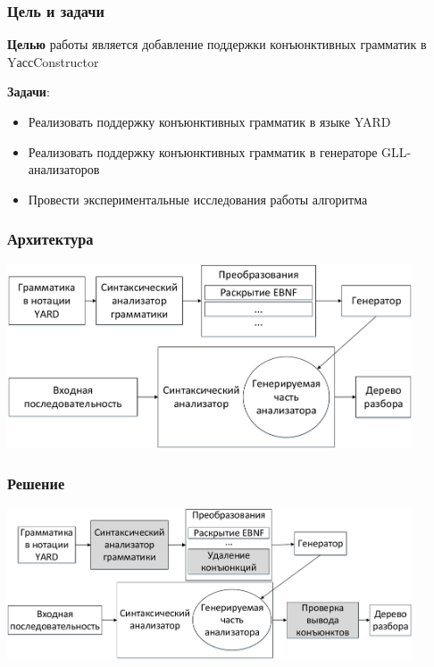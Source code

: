 \documentclass{beamer}
\begin{document}
\begin{frame}
  \transwipe[direction=90]
  \frametitle{Цель и задачи}
  \textbf{Целью} работы является добавление поддержки конъюнктивных грамматик в YассConstructor  

  \textbf{Задачи}:
  \begin{itemize}
    \item Реализовать поддержку конъюнктивных грамматик в языке YARD
    \item Реализовать поддержку конъюнктивных грамматик в генераторе GLL-анализаторов
    \item Провести экспериментальные исследования работы алгоритма
  \end{itemize}
\end{frame}

\begin{frame}
  \transwipe[direction=90]
  \frametitle{Архитектура}
  \includegraphics[width=12cm]{courseworkpictures/img2.pdf}
\end{frame} 

\begin{frame}
  \transwipe[direction=90]
  \frametitle{Решение}
  \includegraphics[width=12cm]{courseworkpictures/img3.pdf}
\end{frame}
\end{document}
